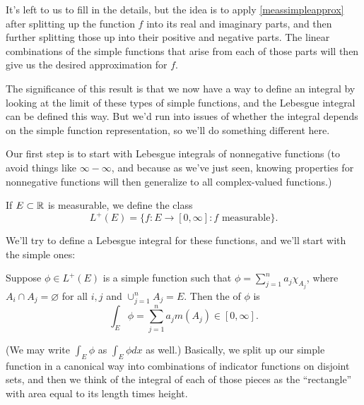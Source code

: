 It's left to us to fill in the details, but the idea is to apply \cref{meassimpleapprox} after splitting up the function $f$ into its real and imaginary parts, and then further splitting those up into their positive and negative parts. The linear combinations of the simple functions that arise from each of those parts will then give us the desired approximation for $f$. 

The significance of this result is that we now have a way to define an integral by looking at the limit of these types of simple functions, and the Lebesgue integral can be defined this way. But we'd run into issues of whether the integral depends on the simple function representation, so we'll do something different here.

Our first step is to start with Lebesgue integrals of nonnegative functions (to avoid things like $\infty - \infty$, and because as we've just seen, knowing properties for nonnegative functions will then generalize to all complex-valued functions.)

\begin{definition}
If $E \subset \mathbb R$ is measurable, we define the class 
\[
    L^+(E) = \{f: E \to [0, \infty]: f \text{ measurable}\}.
\]
\end{definition}

We'll try to define a Lebesgue integral for these functions, and we'll start with the simple ones: 

\begin{definition}
Suppose $\phi \in L^+(E)$ is a simple function such that $\phi = \sum_{j=1}^n a_j \chi_{A_j}$, where $A_i \cap A_j = \varnothing$ for all $i, j$ and $\cup_{j=1}^n A_j = E$. Then the  of $\phi$ is 
\[
    \int_E \phi = \sum_{j=1}^n a_j m(A_j) \in [0, \infty].
\]
\end{definition}

(We may write $\int_E \phi$ as $\int_E \phi dx$ as well.) Basically, we split up our simple function in a canonical way into combinations of indicator functions on disjoint sets, and then we think of the integral of each of those pieces as the ``rectangle'' with area equal to its length times height.

